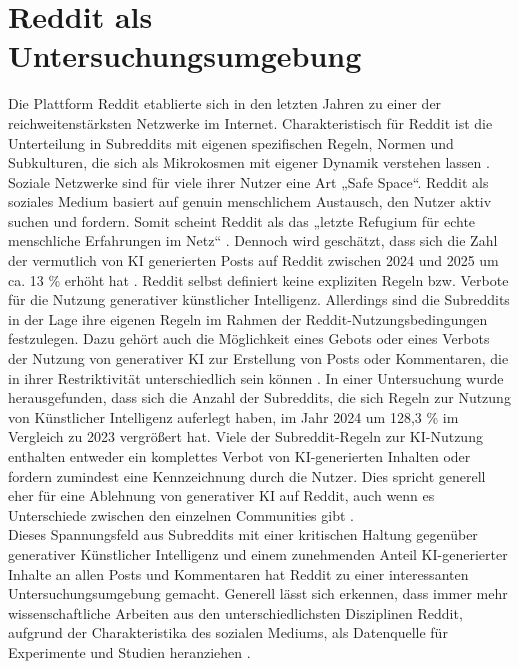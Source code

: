 \section{Reddit als Untersuchungsumgebung}
\label{sec:reddit_untersuchungsumgebung}
Die Plattform Reddit etablierte sich in den letzten Jahren zu einer der reichweitenstärksten Netzwerke im Internet. Charakteristisch für Reddit ist die Unterteilung in Subreddits mit eigenen spezifischen Regeln, Normen und Subkulturen, die sich als Mikrokosmen mit eigener Dynamik verstehen lassen \autocite{proferes2021}.
Soziale Netzwerke sind für viele ihrer Nutzer eine Art „Safe Space“. Reddit als soziales Medium  basiert auf genuin menschlichem Austausch, den Nutzer aktiv suchen und fordern. Somit scheint Reddit als das „letzte Refugium für echte menschliche Erfahrungen im Netz“ \autocite{schiffer2026}.  Dennoch wird geschätzt, dass sich die Zahl der vermutlich von KI generierten Posts auf Reddit zwischen 2024 und 2025 um ca. 13 \% erhöht hat \autocite{lambert2025}.
Reddit selbst definiert keine expliziten Regeln bzw. Verbote für die Nutzung generativer künstlicher Intelligenz. Allerdings sind die Subreddits in der Lage ihre eigenen Regeln im Rahmen der Reddit-Nutzungsbedingungen festzulegen. Dazu gehört auch die Möglichkeit eines Gebots oder eines Verbots der Nutzung von generativer KI zur Erstellung von Posts oder Kommentaren, die in ihrer Restriktivität unterschiedlich sein können \autocite{redditrichtlinie}. In einer Untersuchung wurde herausgefunden, dass sich die Anzahl der Subreddits, die sich Regeln zur Nutzung von Künstlicher Intelligenz auferlegt haben, im Jahr 2024 um 128,3 \% im Vergleich zu 2023 vergrößert hat. Viele der Subreddit-Regeln zur KI-Nutzung enthalten entweder ein komplettes Verbot von KI-generierten Inhalten oder fordern zumindest eine Kennzeichnung durch die Nutzer. Dies spricht generell eher für eine Ablehnung von generativer KI auf Reddit, auch wenn es Unterschiede zwischen den einzelnen Communities gibt \autocite{Lloyd_2025}.\\
Dieses Spannungsfeld aus Subreddits mit einer kritischen Haltung gegenüber generativer Künstlicher Intelligenz und einem zunehmenden Anteil KI-generierter Inhalte an allen Posts und Kommentaren hat Reddit zu einer interessanten Untersuchungsumgebung gemacht. Generell lässt sich erkennen, dass immer mehr wissenschaftliche Arbeiten aus den unterschiedlichsten Disziplinen Reddit, aufgrund der Charakteristika des sozialen Mediums, als Datenquelle für Experimente und Studien heranziehen \autocite{proferes2021}. \\

